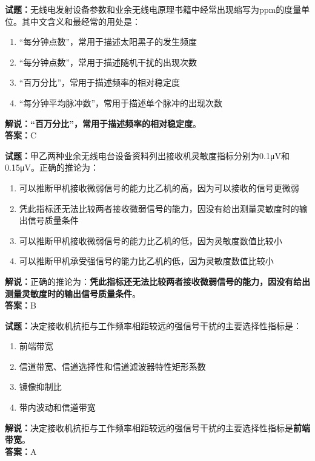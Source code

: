 \documentclass{ctexbook}
\begin{document}
\bigskip


\noindent\textbf{试题：}无线电发射设备参数和业余无线电原理书籍中经常出现缩写为ppm的度量单位。其中文含义和最经常的用处是：
\begin{enumerate}[leftmargin=3em]
\item “每分钟点数”，常用于描述太阳黑子的发生频度
\item “每分钟点数”，常用于描述随机干扰的出现次数
\item “百万分比”，常用于描述频率的相对稳定度
\item “每分钟平均脉冲数”，常用于描述单个脉冲的出现次数
\end{enumerate}
\noindent\textbf{解说：}\textbf{“百万分比”，常用于描述频率的相对稳定度}。\\\noindent\textbf{答案：}C



\bigskip


\noindent\textbf{试题：}甲乙两种业余无线电台设备资料列出接收机灵敏度指标分别为0.1μV和0.15μV。正确的推论为：
\begin{enumerate}[leftmargin=3em]
\item 可以推断甲机接收微弱信号的能力比乙机的高，因为可以接收的信号更微弱
\item 凭此指标还无法比较两者接收微弱信号的能力，因没有给出测量灵敏度时的输出信号质量条件
\item 可以推断甲机接收微弱信号的能力比乙机的低，因为灵敏度数值比较小
\item 可以推断甲机承受强信号的能力比乙机的低，因为灵敏度数值比较小
\end{enumerate}
\noindent\textbf{解说：}正确的推论为：\textbf{凭此指标还无法比较两者接收微弱信号的能力，因没有给出测量灵敏度时的输出信号质量条件}。\\\noindent\textbf{答案：}B



\bigskip


\noindent\textbf{试题：}决定接收机抗拒与工作频率相距较远的强信号干扰的主要选择性指标是：
\begin{enumerate}[leftmargin=3em]
\item 前端带宽
\item 信道带宽、信道选择性和信道滤波器特性矩形系数
\item 镜像抑制比
\item 带内波动和信道带宽
\end{enumerate}
\noindent\textbf{解说：}决定接收机抗拒与工作频率相距较远的强信号干扰的主要选择性指标是\textbf{前端带宽}。\\\noindent\textbf{答案：}A
\end{document}
